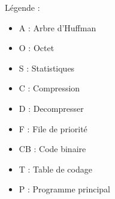 Légende :
\begin{itemize}
    \item A : Arbre d'Huffman
    \item O : Octet
    \item S : Statistiques
    \item C : Compression
    \item D : Decompresser
    \item F : File de priorité
    \item CB : Code binaire
    \item T : Table de codage
    \item P : Programme principal
\end{itemize}